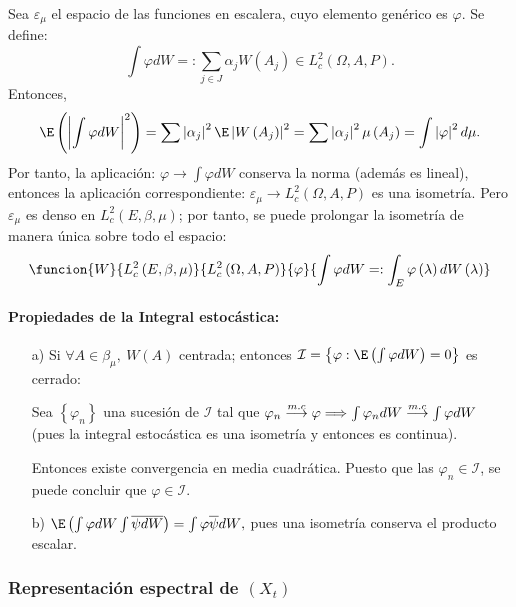 Sea $\varepsilon_{\mu }$ el espacio de las funciones en escalera, cuyo elemento gen\'{e}rico es $\varphi $. Se define:
\[
\int {\varphi dW} =:\sum_{j\in J} {\alpha_{j}W\left( A_{j} \right)} 
\in L_{c}^{2}\left(\Omega,A,P \right).
\]
Entonces,
\[
\E\left( \left| \int {\varphi dW} \right|^{2} \right)=\sum \left| \alpha_{j} \right|^{2} \E\left| W\left( A_{j} \right) \right|^{2}=\sum \left| \alpha_{j} \right|^{2} \mu \left( A_{j} \right)=\int \left| \varphi \right|^{2} d\mu.
\]
Por tanto, la aplicaci\'{o}n: $\varphi \to \int {\varphi dW} $ conserva la norma (adem\'{a}s es lineal), entonces la aplicaci\'{o}n correspondiente: $\varepsilon_{\mu }\to L_{c}^{2}\left(\Omega,A,P \right)$ es una isometr\'{i}a. Pero $\varepsilon_{\mu}$ es denso en $L_{c}^{2}\left( E,\beta ,\mu \right)$; por tanto, se puede prolongar la isometr\'{i}a de manera \'{u}nica sobre todo el espacio:
\[
\funcion{W}{L_{c}^{2}\left( E,\beta ,\mu \right)}{L_{c}^{2}\left(\Omega,A,P \right)}{\varphi}{\displaystyle\int {\varphi dW} =:\int_E {\varphi \left( \lambda \right)dW\left( \lambda \right)} }
\]

\paragraph{Propiedades de la Integral estoc\'{a}stica:}

\begin{enumerate}
\item[a)] Si $\forall A\in \beta_{\mu },\ W(A)$ centrada; entonces $\mathcal{I}=\left\{ \varphi :\E\left( \int {\varphi dW} \right)=0 \right\}$ es cerrado:\newline

Sea $\left\{ \varphi_{n} \right\}$ una sucesi\'{o}n de $\mathcal{I}$ tal que $\varphi_{n}\buildrel {m.c} \over \longrightarrow \varphi \Longrightarrow \int \varphi_{n} dW\buildrel {m.c} \over \longrightarrow \int {\varphi dW} $ (pues la integral estoc\'{a}stica es una isometr\'{i}a y entonces es continua).\newline

Entonces existe convergencia en media cuadr\'{a}tica. Puesto que las $\varphi_{n}\in \mathcal{I}$, se puede concluir que $\varphi \in \mathcal{I}$.

\item[b)] $\E\left( \int {\varphi dW} \int \overline{\psi dW} \right)=\int {\varphi \overline{\psi }dW} ,$ pues una isometr\'{i}a conserva el producto escalar.
\end{enumerate}

\subsubsection{Representaci\'{o}n espectral de $\left(X_{t} \right)$ }

